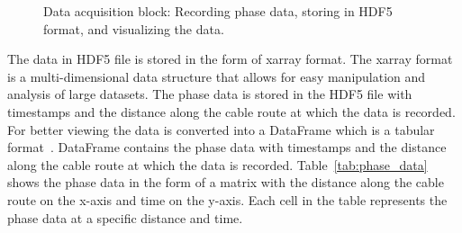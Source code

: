 \begin{figure}[ht]
  \centering
  \caption{Data acquisition block: Recording phase data, storing in HDF5 format, and visualizing the data.}
  \label{fig:daq-simple}
\end{figure}
The data in HDF5 file is stored in the form of xarray format. The xarray format is a multi-dimensional data structure that allows for easy manipulation and analysis of large datasets. The phase data is stored in the HDF5 file with timestamps and the distance along the cable route at which the data is recorded. For better viewing the data is converted into a DataFrame which is a tabular format~\cite{mckinney2010data}. DataFrame contains the phase data with timestamps and the distance along the cable route at which the data is recorded. Table~\ref{tab:phase_data} shows the phase data in the form of a matrix with the distance along the cable route on the x-axis and time on the y-axis. Each cell in the table represents the phase data at a specific distance and time. 

